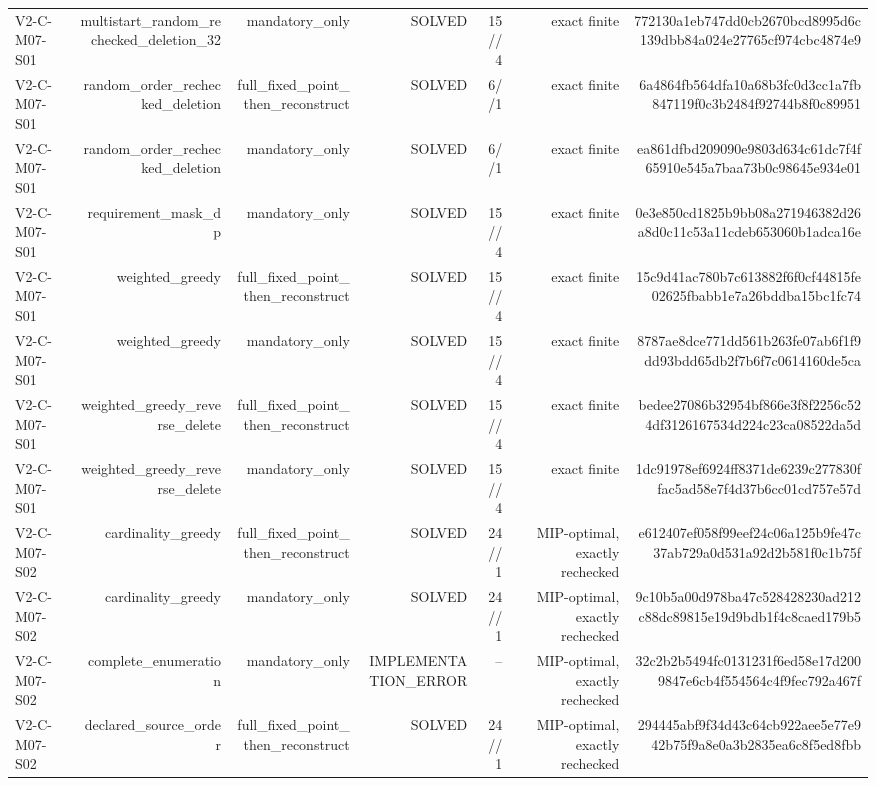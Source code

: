 {\begin{longtable}{lrrrrrr}
V2-C-M07-S01 & multistart\_random\_rechecked\_deletion\_32 & mandatory\_only & SOLVED & 15//4 & exact finite & 772130a1eb747dd0cb2670bcd8995d6c139dbb84a024e27765cf974cbc4874e9 \\
V2-C-M07-S01 & random\_order\_rechecked\_deletion & full\_fixed\_point\_then\_reconstruct & SOLVED & 6//1 & exact finite & 6a4864fb564dfa10a68b3fc0d3cc1a7fb847119f0c3b2484f92744b8f0c89951 \\
V2-C-M07-S01 & random\_order\_rechecked\_deletion & mandatory\_only & SOLVED & 6//1 & exact finite & ea861dfbd209090e9803d634c61dc7f4f65910e545a7baa73b0c98645e934e01 \\
V2-C-M07-S01 & requirement\_mask\_dp & mandatory\_only & SOLVED & 15//4 & exact finite & 0e3e850cd1825b9bb08a271946382d26a8d0c11c53a11cdeb653060b1adca16e \\
V2-C-M07-S01 & weighted\_greedy & full\_fixed\_point\_then\_reconstruct & SOLVED & 15//4 & exact finite & 15c9d41ac780b7c613882f6f0cf44815fe02625fbabb1e7a26bddba15bc1fc74 \\
V2-C-M07-S01 & weighted\_greedy & mandatory\_only & SOLVED & 15//4 & exact finite & 8787ae8dce771dd561b263fe07ab6f1f9dd93bdd65db2f7b6f7c0614160de5ca \\
V2-C-M07-S01 & weighted\_greedy\_reverse\_delete & full\_fixed\_point\_then\_reconstruct & SOLVED & 15//4 & exact finite & bedee27086b32954bf866e3f8f2256c524df3126167534d224c23ca08522da5d \\
V2-C-M07-S01 & weighted\_greedy\_reverse\_delete & mandatory\_only & SOLVED & 15//4 & exact finite & 1dc91978ef6924ff8371de6239c277830ffac5ad58e7f4d37b6cc01cd757e57d \\
V2-C-M07-S02 & cardinality\_greedy & full\_fixed\_point\_then\_reconstruct & SOLVED & 24//1 & MIP-optimal, exactly rechecked & e612407ef058f99eef24c06a125b9fe47c37ab729a0d531a92d2b581f0c1b75f \\
V2-C-M07-S02 & cardinality\_greedy & mandatory\_only & SOLVED & 24//1 & MIP-optimal, exactly rechecked & 9c10b5a00d978ba47c528428230ad212c88dc89815e19d9bdb1f4c8caed179b5 \\
V2-C-M07-S02 & complete\_enumeration & mandatory\_only & IMPLEMENTATION\_ERROR & -- & MIP-optimal, exactly rechecked & 32c2b2b5494fc0131231f6ed58e17d2009847e6cb4f554564c4f9fec792a467f \\
V2-C-M07-S02 & declared\_source\_order & full\_fixed\_point\_then\_reconstruct & SOLVED & 24//1 & MIP-optimal, exactly rechecked & 294445abf9f34d43c64cb922aee5e77e942b75f9a8e0a3b2835ea6c8f5ed8fbb \\

\end{longtable}}
